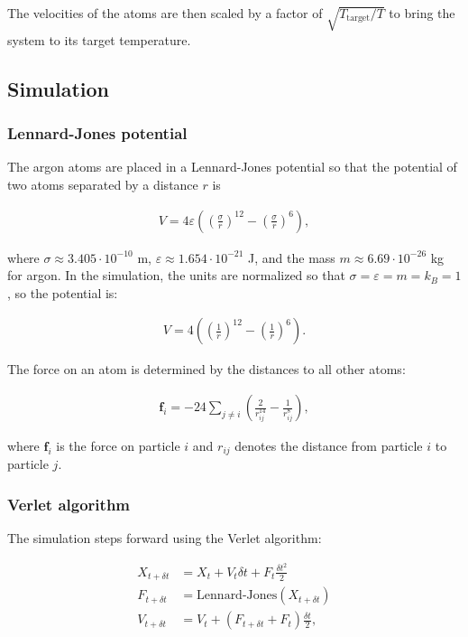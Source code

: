 \documentclass[twocolumn]{revtex4}
\begin{document}
The velocities of the atoms are then scaled by a factor of $\sqrt{T_{\text{target}}/T}$ to bring the system to its target temperature.

\subsection{Simulation}

\subsubsection{Lennard-Jones potential}
\label{sec:lj}

The argon atoms are placed in a Lennard-Jones potential so that the potential of two atoms separated by a distance $r$ is

\begin{align}
V = 4\varepsilon \left( \left(\frac{\sigma}{r}\right)^{12} - \left(\frac{\sigma}{r}\right)^6 \right),
\end{align}

where $\sigma \approx 3.405\cdot10^{-10}$ m, $\varepsilon \approx 1.654\cdot10^{-21}$ J, and the mass $m \approx 6.69\cdot10^{-26}$ kg for argon. In the simulation, the units are normalized so that $\sigma = \varepsilon = m = k_B = 1$, so the potential is:

\begin{align}
V = 4 \left( \left(\frac{1}{r}\right)^{12} - \left(\frac{1}{r}\right)^6 \right).
\end{align}

The force on an atom is determined by the distances to all other atoms:

\begin{align}
\mathbf{f}_{i} = -24 \sum_{j\ne i} \left( \frac{2}{r_{ij}^{14}} - \frac{1}{r_{ij}^8} \right),
\end{align}

where $\mathbf{f}_i$ is the force on particle $i$ and $r_{ij}$ denotes the distance from particle $i$ to particle $j$.

\subsubsection{Verlet algorithm}
\label{sec:verlet}

The simulation steps forward using the Verlet algorithm:

\begin{align}
X_{t+\delta t} &= X_t + V_t \delta t + F_t \frac{\delta t^2}{2}\\
F_{t+\delta t} &= \text{Lennard-Jones}(X_{t+\delta t})\\
V_{t+\delta t} &= V_t + (F_{t+\delta t} + F_t) \frac{\delta t}{2},
\end{align}
\end{document}
